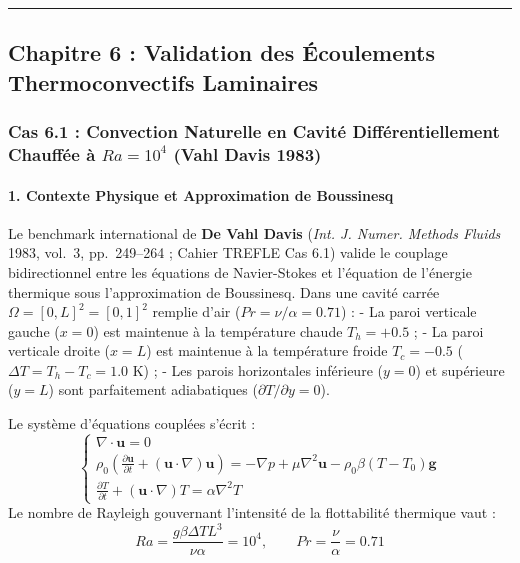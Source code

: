 \documentclass[
  10pt,
]{article}
\begin{document}
\begin{center}\rule{0.5\linewidth}{0.5pt}\end{center}

\subsection{Chapitre 6 : Validation des Écoulements Thermoconvectifs
Laminaires}\label{chapitre-6-validation-des-uxe9coulements-thermoconvectifs-laminaires}

\subsubsection{\texorpdfstring{Cas 6.1 : Convection Naturelle en Cavité
Différentiellement Chauffée à \(Ra = 10^4\) (Vahl Davis
1983)}{Cas 6.1 : Convection Naturelle en Cavité Différentiellement Chauffée à Ra = 10\^{}4 (Vahl Davis 1983)}}\label{cas-6.1-convection-naturelle-en-cavituxe9-diffuxe9rentiellement-chauffuxe9e-uxe0-ra-104-vahl-davis-1983}

\paragraph{1. Contexte Physique et Approximation de
Boussinesq}\label{contexte-physique-et-approximation-de-boussinesq}

Le benchmark international de \textbf{De Vahl Davis} (\emph{Int. J.
Numer. Methods Fluids} 1983, vol.~3, pp.~249--264 ; Cahier TREFLE Cas
6.1) valide le couplage bidirectionnel entre les équations de
Navier-Stokes et l'équation de l'énergie thermique sous l'approximation
de Boussinesq. Dans une cavité carrée \(\Omega = [0, L]^2 = [0, 1]^2\)
remplie d'air (\(Pr = \nu / \alpha = 0.71\)) : - La paroi verticale
gauche (\(x=0\)) est maintenue à la température chaude \(T_h = +0.5\) ;
- La paroi verticale droite (\(x=L\)) est maintenue à la température
froide \(T_c = -0.5\) (\(\Delta T = T_h - T_c = 1.0\text{ K}\)) ; - Les
parois horizontales inférieure (\(y=0\)) et supérieure (\(y=L\)) sont
parfaitement adiabatiques (\(\partial T / \partial y = 0\)).

Le système d'équations couplées s'écrit : \[\begin{cases}
\nabla \cdot \mathbf{u} = 0 \\[4pt]
\rho_0 \left( \frac{\partial \mathbf{u}}{\partial t} + (\mathbf{u} \cdot \nabla)\mathbf{u} \right) = -\nabla p + \mu \nabla^2 \mathbf{u} - \rho_0 \beta (T - T_0) \mathbf{g} \\[4pt]
\frac{\partial T}{\partial t} + (\mathbf{u} \cdot \nabla) T = \alpha \nabla^2 T
\end{cases}\] Le nombre de Rayleigh gouvernant l'intensité de la
flottabilité thermique vaut :
\[Ra = \frac{g \beta \Delta T L^3}{\nu \alpha} = 10^4, \qquad Pr = \frac{\nu}{\alpha} = 0.71\]
\end{document}
